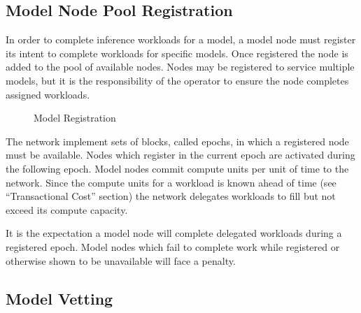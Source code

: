 \documentclass[conference]{IEEEtran}
\begin{document}
\subsection{Model Node Pool Registration}
In order to complete inference workloads for a model, a model node must register its intent to complete workloads for specific models. Once registered the node is added to the pool of available nodes. Nodes may be registered to service multiple models, but it is the responsibility of the operator to ensure the node completes assigned workloads.

\begin{figure}[!ht]
    \centering
{}
    \caption{Model Registration}
    \label{fig:Fig 3}
\end{figure}

The network implement sets of blocks, called epochs, in which a registered node must be available. Nodes which register in the current epoch are activated during the following epoch. Model nodes commit compute units per unit of time to the network. Since the compute units for a workload is known ahead of time (see “Transactional Cost” section) the network delegates workloads to fill but not exceed its compute capacity. 

It is the expectation a model node will complete delegated workloads during a registered epoch. Model nodes which fail to complete work while registered or otherwise shown to be unavailable will face a penalty.

\subsection{Model Vetting}
\end{document}
